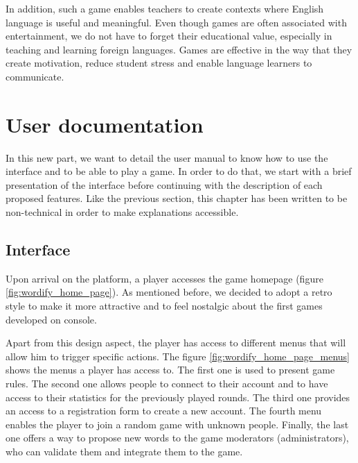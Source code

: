 \documentclass{tnreport}
\begin{document}
In addition, such a game enables teachers to create contexts where English language is useful and meaningful. Even though games are often associated with entertainment, we do not have to forget their educational value, especially in teaching and learning foreign languages. Games are effective in the way that they create motivation, reduce student stress and enable language learners to communicate.

\cleardoublepage

\chapter{User documentation}

In this new part, we want to detail the user manual to know how to use the interface and to be able to play a game. In order to do that, we start with a brief presentation of the interface before continuing with the description of each proposed features. Like the previous section, this chapter has been written to be non-technical in order to make explanations accessible. 

\section{Interface}

Upon arrival on the platform, a player accesses the game homepage (figure \ref{fig:wordify_home_page}). As mentioned before, we decided to adopt a retro style to make it more attractive and to feel nostalgic about the first games developed on console. 

Apart from this design aspect, the player has access to different menus that will allow him to trigger specific actions. The figure \ref{fig:wordify_home_page_menus} shows the menus a player has access to.  The first one is used to present game rules. The second one allows people to connect to their account and to have access to their statistics for the previously played rounds. The third one provides an access to a registration form to create a new account. The fourth menu enables the player to join a random game with unknown people. Finally, the last one offers a way to propose new words to the game moderators (administrators), who can validate them and integrate them to the game. 
\end{document}
